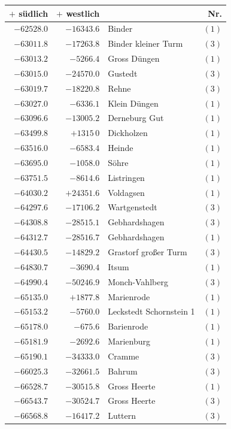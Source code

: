 \clearpage{}%
\begin{center}\begingroup\fontsize{8}{9}\selectfont
\setlength{\tabcolsep}{4pt}
\begin{tabular}{r|r|p{170pt}|r}\hline
\(+\) südlich&\(+\) westlich&&Nr.\\\hline
\(-62528.0\)&\(-16343.6\)&Binder&\((1)\)\\
\(-63011.8\)&\(-17263.8\)&Binder kleiner Turm&\((3)\)\\
\(-63013.2\)&\(-5266.4\)&Gross Düngen&\((1)\)\\
\(-63015.0\)&\(-24570.0\)&Gustedt&\((3)\)\\
\(-63019.7\)&\(-18220.8\)&Rehne&\((3)\)\\
\(-63027.0\)&\(-6336.1\)&Klein Düngen&\((1)\)\\
\(-63096.6\)&\(-13005.2\)&Derneburg Gut&\((1)\)\\
\(-63499.8\)&\(+1315\,0\)&Dickholzen&\((1)\)\\
\(-63516.0\)&\(-6583.4\)&Heinde&\((1)\)\\
\(-63695.0\)&\(-1058.0\)&Söhre&\((1)\)\\
\(-63751.5\)&\(-8614.6\)&Listringen&\((1)\)\\
\(-64030.2\)&\(+24351.6\)&Voldagsen&\((1)\)\\
\(-64297.6\)&\(-17106.2\)&Wartgenstedt&\((3)\)\\
\(-64308.8\)&\(-28515.1\)&Gebhardshagen&\((3)\)\\
\(-64312.7\)&\(-28516.7\)&Gebhardshagen&\((1)\)\\
\(-64430.5\)&\(-14829.2\)&Grastorf großer Turm&\((3)\)\\
\(-64830.7\)&\(-3690.4\)&Itsum&\((1)\)\\
\(-64990.4\)&\(-50246.9\)&Monch-Vahlberg&\((3)\)\\
\(-65135.0\)&\(+1877.8\)&Marienrode&\((1)\)\\
\(-65153.2\)&\(-5760.0\)&Leckstedt Schornstein 1&\((1)\)\\
\(-65178.0\)&\(-675.6\)&Barienrode&\((1)\)\\
\(-65181.9\)&\(-2692.6\)&Marienburg&\((1)\)\\
\(-65190.1\)&\(-34333.0\)&Cramme&\((3)\)\\
\(-66025.3\)&\(-32661.5\)&Bahrum&\((3)\)\\
\(-66528.7\)&\(-30515.8\)&Gross Heerte&\((1)\)\\
\(-66543.7\)&\(-30524.7\)&Gross Heerte&\((3)\)\\
\(-66568.8\)&\(-16417.2\)&Luttern&\((3)\)\\

\end{tabular}
\end{center}
